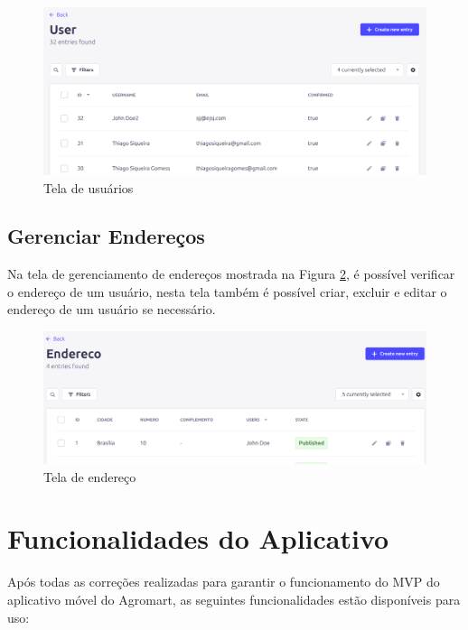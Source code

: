\begin{figure}[h]
	\centering
	\includegraphics[keepaspectratio=true,scale=0.28]{figuras/painel_usuarios.png}
	\caption{Tela de usuários}
        \label{tela-usuarios-cms}
\end{figure}

\subsection{Gerenciar Endereços}
Na tela de gerenciamento de endereços mostrada na Figura \ref{tela-endereco-cms}, é possível verificar o endereço de um usuário, nesta tela também é possível criar, excluir e editar o endereço de um usuário se necessário.

\begin{figure}[h]
	\centering
	\includegraphics[keepaspectratio=true,scale=0.28]{figuras/painel_endereco.png}
	\caption{Tela de endereço}
        \label{tela-endereco-cms}
\end{figure}

\section{Funcionalidades do Aplicativo}
Após todas as correções realizadas para garantir o funcionamento do MVP do aplicativo móvel do Agromart, as seguintes funcionalidades estão disponíveis para uso:


